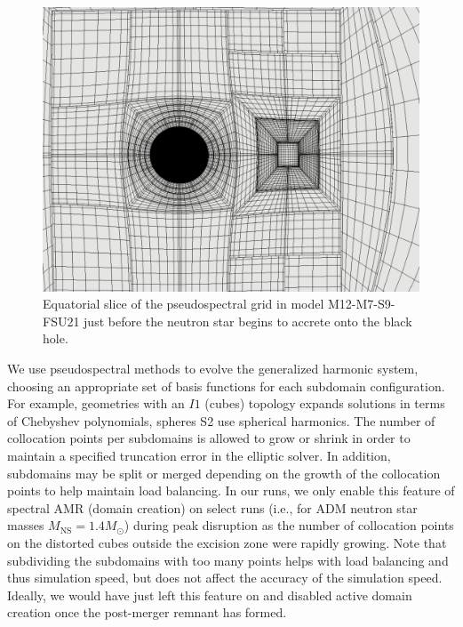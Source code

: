 \begin{figure}
	\centering
	\includegraphics[width=1.0\linewidth]{images/M12_FSU21-pseudospectral-grid}
	\caption[Equatorial slice of the pseudospectral grid]{Equatorial slice of the pseudospectral grid in model M12-M7-S9-FSU21 just before the neutron star begins to accrete onto the black hole.}
	\label{fig:pseudospectral-grid}
\end{figure}

We use pseudospectral methods to evolve the generalized harmonic system, choosing an appropriate set of basis functions for each subdomain configuration.
For example, geometries with an $I1$ (cubes) topology expands solutions in terms of Chebyshev polynomials, spheres S2 use spherical harmonics.
The number of collocation points per subdomains is allowed to grow or shrink in order to maintain a specified truncation error in the elliptic solver.
In addition, subdomains may be split or merged depending on the growth of the collocation points to help maintain load balancing.
In our runs, we only enable this feature of spectral AMR (domain creation) on select runs (i.e., for ADM neutron star masses $M_\textrm{NS} = 1.4 M_\odot$) during peak disruption as the number of collocation points on the distorted cubes outside the excision zone were rapidly growing.
Note that subdividing the subdomains with too many points helps with load balancing and thus simulation speed, but does not affect the accuracy of the simulation speed.
Ideally, we would have just left this feature on and disabled active domain creation once the post-merger remnant has formed.


